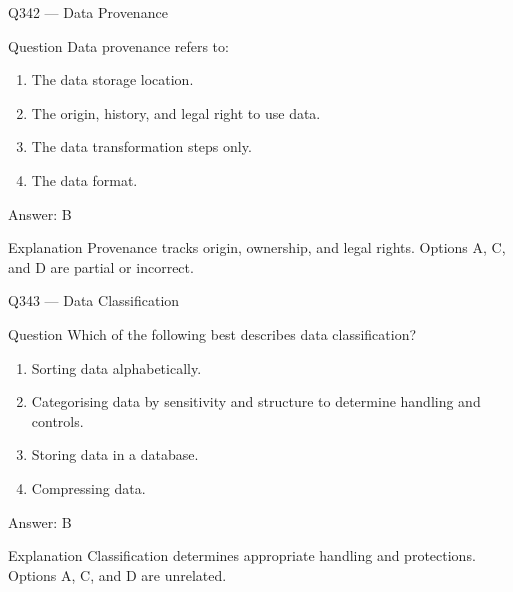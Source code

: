 \documentclass[aspectratio=169,8pt]{beamer}
\begin{document}
\begin{frame}{Q342 --- Data Provenance}
	\begin{block}{Question}
		Data provenance refers to:
		\begin{enumerate}
			\item The data storage location.
			\item The origin, history, and legal right to use data.
			\item The data transformation steps only.
			\item The data format.
	\end{enumerate}  \end{block}
	\begin{exampleblock}{Answer: B}\end{exampleblock}
	\begin{block}{Explanation}
		Provenance tracks origin, ownership, and legal rights. Options A, C, and D are partial or incorrect.
	\end{block}
\end{frame}

\begin{frame}{Q343 --- Data Classification}
	\begin{block}{Question}
		Which of the following best describes data classification?
		\begin{enumerate}
			\item Sorting data alphabetically.
			\item Categorising data by sensitivity and structure to determine handling and controls.
			\item Storing data in a database.
			\item Compressing data.
	\end{enumerate}  \end{block}
	\begin{exampleblock}{Answer: B}\end{exampleblock}
	\begin{block}{Explanation}
		Classification determines appropriate handling and protections. Options A, C, and D are unrelated.
	\end{block}
\end{frame}
\end{document}
